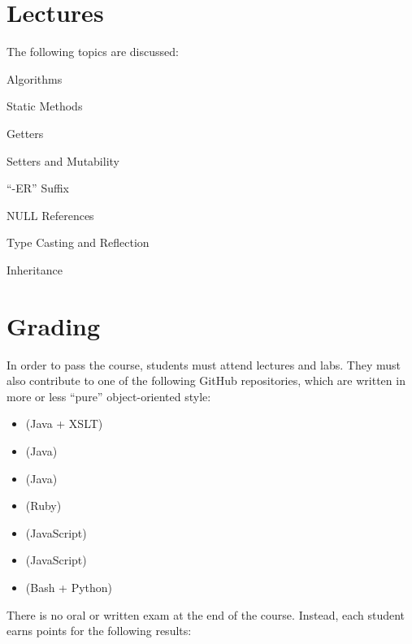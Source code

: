 \documentclass[nobrand,anonymous,nodate,nosecurity]{huawei}
\begin{document}
\newpage
\section*{Lectures}

The following topics are discussed:

\begin{lectures}
\item Algorithms
\item Static Methods
\item Getters
\item Setters and Mutability
\item ``-ER'' Suffix
\item NULL References
\item Type Casting and Reflection
\item Inheritance
\end{lectures}

\newpage
\section*{Grading}

In order to pass the course, students must attend lectures and labs.
They must also contribute to one of the following GitHub repositories, which are written in more or less ``pure'' object-oriented style:

\begin{itemize}
    \item \href{https://github.com/objectionary/eo}{} (Java + XSLT)
    \item \href{https://github.com/yegor256/cactoos}{} (Java)
    \item \href{https://github.com/yegor256/takes}{} (Java)
    \item \href{https://github.com/yegor256/factbase}{} (Ruby)
    \item \href{https://github.com/objectionary/eoc}{} (JavaScript)
    \item \href{https://github.com/objectionary/eo2js}{} (JavaScript)
    \item \href{https://github.com/yegor256/cam}{} (Bash + Python)
\end{itemize}

There is no oral or written exam at the end of the course.
Instead, each student earns points for the following results:
\end{document}
